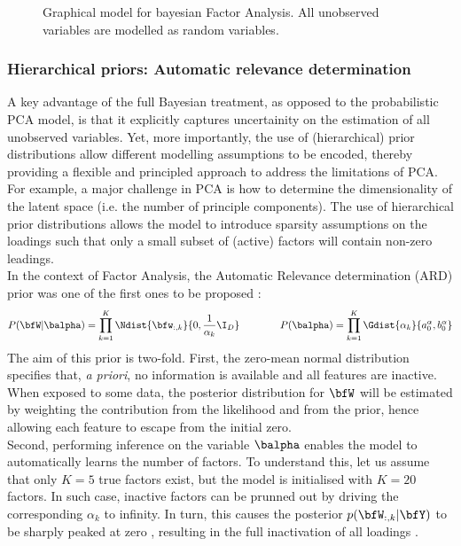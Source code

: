 \begin{figure}[H] \begin{center}
	
	\label{fig:bayesianFA}
	\caption{Graphical model for bayesian Factor Analysis. All unobserved variables are modelled as random variables.}
\end{center} \end{figure}

\subsubsection{Hierarchical priors: Automatic relevance determination}
A key advantage of the full Bayesian treatment, as opposed to the probabilistic PCA model, is that it explicitly captures uncertainity on the estimation of all unobserved variables. Yet, more importantly, the use of (hierarchical) prior distributions allow different modelling assumptions to be encoded, thereby providing a flexible and principled approach to address the limitations of PCA.\\

For example, a major challenge in PCA is how to determine the dimensionality of the latent space (i.e. the number of principle components). The use of hierarchical prior distributions allows the model to introduce sparsity assumptions on the loadings such that only a small subset of (active) factors will contain non-zero leadings.\\
In the context of Factor Analysis, the Automatic Relevance determination (ARD) prior was one of the first ones to be proposed \cite{(David J. C. MacKay, 1994; Neal, 1995; Wipf and Nagarajan, 2008)}:
\begin{equation*} \label{eq:ard}
	P(\bfW|\balpha) = \prod_{k=1}^{K} \Ndist{\bfw_{:,k}}{0,\frac{1}{\alpha_{k}}\I_{D}}\\
	\qquad\qquad
	P(\balpha) = \prod_{k=1}^{K} \Gdist{\alpha_k}{a_0^\alpha, b_0^\alpha}\\
\end{equation*}
The aim of this prior is two-fold. First, the zero-mean normal distribution specifies that, \textit{a priori}, no information is available and all features are inactive. When exposed to some data, the posterior distribution for $\bfW$ will be estimated by weighting the contribution from the likelihood and from the prior, hence allowing each feature to escape from the initial zero.\\
Second, performing inference on the variable $\balpha$ enables the model to automatically learns the number of factors. To understand this, let us assume that only $K=5$ true factors exist, but the model is initialised with $K=20$ factors. In such case, inactive factors can be prunned out by driving the corresponding $\alpha_k$ to infinity. In turn, this causes the posterior $p(\bfW_{:,k}|\bfY)$ to be sharply peaked at zero , resulting in the full inactivation of all loadings . 

